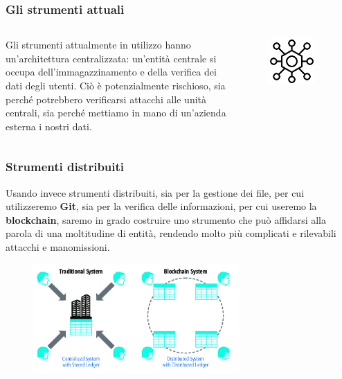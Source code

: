\documentclass{beamer}
\begin{document}
\begin{frame}
	\frametitle{Gli strumenti attuali}
	\begin{columns}
		Gli strumenti attualmente in utilizzo hanno un'architettura centralizzata:
		un'entità centrale si occupa dell'immagazzinamento e della verifica dei dati
		degli utenti. Ciò è potenzialmente rischioso, sia perché potrebbero verificarsi
		attacchi alle unità centrali,
		sia perché mettiamo in mano di un'azienda esterna i nostri dati.
		\begin{figure}
			\includegraphics[width=0.80\textwidth]{cent.png}
		\end{figure}
	\end{columns}
\end{frame}

\begin{frame}
	\frametitle{Strumenti distribuiti}
		Usando invece strumenti distribuiti, sia per la gestione dei file,
		per cui utilizzeremo \textbf{Git}, sia per la verifica delle informazioni,
		per cui useremo la \textbf{blockchain}, saremo in grado costruire uno strumento
		che può affidarsi alla parola di una moltitudine di entità, rendendo molto
		più complicati e rilevabili attacchi e manomissioni.
	\medskip
	\begin{figure}
		\includegraphics[width=0.70\textwidth]{dece.jpg}
	\end{figure}
\end{frame}
\end{document}
